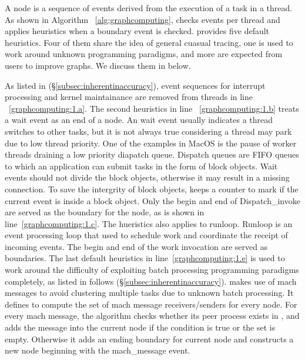 A node is a sequence of events derived from the execution of a task in a thread.
As shown in Algorithm ~\ref{alg:graphcomputing}, \xxx checks events per
thread and applies heuristics when a boundary event is checked. \xxx provides
five default heuristics. Four of them share the idea of general cuasual tracing,
one is used to work around unknown programming paradigms, and more are expected
from users to improve graphs. We discuss them in below.

As listed in (\S\ref{subsec:inherentinaccuracy}), event sequences
for interrupt processing and kernel maintainance are removed from
threads in line ~\ref{graphcomputing:1.a}. The second heuristics in line
~\ref{graphcomputing:1.b} treats a wait event as an end of a node. An wait event
usually indicates a thread switches to other tasks, but it is not always true
considering a thread may park due to low thread priority. One of the examples
in MacOS is the pause of worker threads draining a low priority diapatch queue.
Dispatch queues are FIFO queues to which an application can submit tasks in
the form of block objects. Wait events should not divide the block objects,
otherwise it may result in a missing connection. To save the intergrity of block
objects, \xxx keeps a counter  to mark if the current event
is inside a block object. Only the begin and end of Dispatch\_invoke are served
as the boundary for the node, as is shown in line~\ref{graphcomputing:1.c}.
The hueristics also applies to runloop. Runloop is an event processing loop
that used to schedule work and coordinate the receipt of incoming events.
The begin and end of the work invocation are served as boundaries. The last
default heuristics in line~\ref{graphcomputing:1.e} is used to work around the
difficulty of exploiting batch processing programming paradigms completely, as
listed in follows (\S\ref{subsec:inherentinaccuracy}). \xxx makes use of mach
messages to avoid clustering multiple tasks due to unknown batch processing. It
defines  to compute the set of mach message receivers/senders
for every node. For every mach message, the algorithm checks whether its peer
process exists in , and adds the message into the current
node if the condition is true or the set is empty. Otherwise it adds an
ending boundary for current node and constructs a new node beginning with the
mach\_message event.

